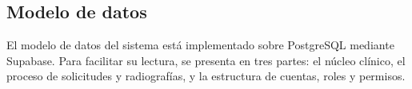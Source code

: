 	
		
		
		
		
		
		
		
	
	



\subsection{Modelo de datos}

El modelo de datos del sistema está implementado sobre PostgreSQL mediante
Supabase. Para facilitar su lectura, se presenta en tres partes: el núcleo
clínico, el proceso de solicitudes y radiografías, y la estructura de
cuentas, roles y permisos.




